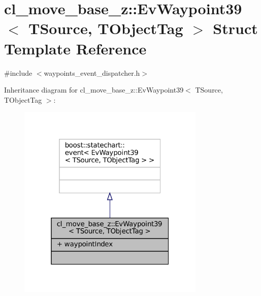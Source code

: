 \hypertarget{structcl__move__base__z_1_1EvWaypoint39}{}\section{cl\+\_\+move\+\_\+base\+\_\+z\+:\+:Ev\+Waypoint39$<$ T\+Source, T\+Object\+Tag $>$ Struct Template Reference}
\label{structcl__move__base__z_1_1EvWaypoint39}


{\ttfamily \#include $<$waypoints\+\_\+event\+\_\+dispatcher.\+h$>$}



Inheritance diagram for cl\+\_\+move\+\_\+base\+\_\+z\+:\+:Ev\+Waypoint39$<$ T\+Source, T\+Object\+Tag $>$\+:
\nopagebreak
\begin{figure}[H]
\begin{center}
\leavevmode
\includegraphics[width=253pt]{structcl__move__base__z_1_1EvWaypoint39__inherit__graph}
\end{center}
\end{figure}


